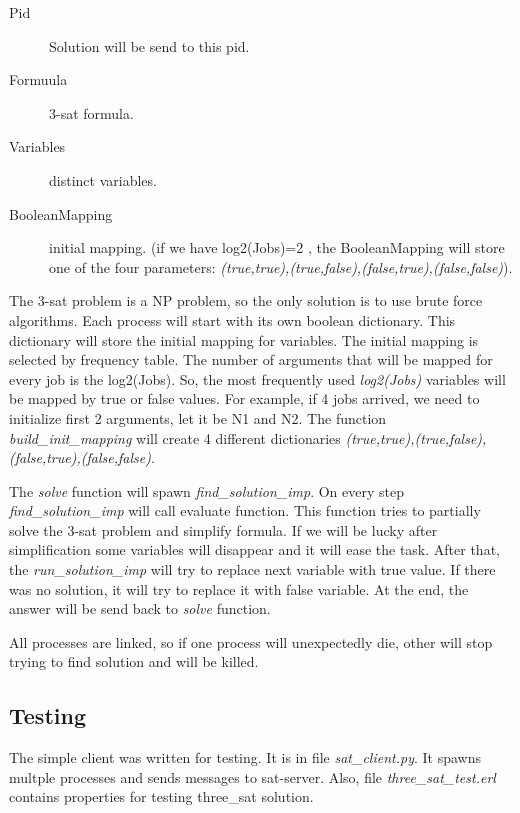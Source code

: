 \documentclass[11pt, a4paper]{scrartcl}
\begin{document}
\begin{description}
    \item[Pid] Solution will be send to this pid.
    \item[Formuula] 3-sat formula.
    \item[Variables] distinct variables.
    \item[BooleanMapping] initial mapping. (if we have log2(Jobs)=2 , the BooleanMapping will store one of the four parameters: \emph{(true,true),(true,false),(false,true),(false,false)}).
\end{description}

The 3-sat problem is a NP problem, so the only solution is to use brute force algorithms. Each process will start
with its own boolean dictionary. This dictionary will store the initial mapping for variables. The initial mapping is selected by frequency table. The number of arguments that will be mapped for every job is the log2(Jobs). 
So, the most frequently used \emph{log2(Jobs)} variables will be mapped by true or false values. 
For example, if 4 jobs arrived, we need to initialize first 2 arguments, let it be N1 and N2. 
The function \emph{build\_init\_mapping} will create 4 different dictionaries \emph{(true,true),(true,false),
(false,true),(false,false)}. 

The \emph{solve} function will spawn \emph{find\_solution\_imp}. On every step \emph{find\_solution\_imp} will call evaluate function. This function tries to partially solve the 3-sat problem and simplify formula. If we will be lucky after simplification some variables will disappear and it will ease the task. After that, the \emph{run\_solution\_imp} will try to replace next variable with true value. If there was no solution, it will try to replace it with false variable. At the end, the answer will be send back to \emph{solve} function.

All processes are linked, so if one process will unexpectedly die, other will stop trying to find solution and will be killed. 

\subsection{Testing}

The simple client was written for testing. It is in file \emph{sat\_client.py}. It spawns multple processes and sends messages to sat-server. Also, file \emph{three\_sat\_test.erl} contains properties for testing three\_sat solution.
\end{document}
